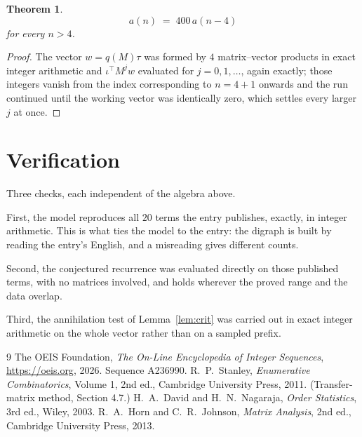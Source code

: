 \documentclass[11pt,a4paper]{article}
\theoremstyle{plain}
\newtheorem{theorem}{Theorem}
\theoremstyle{definition}
\begin{document}
\begin{theorem}
\[
a(n)\;=\;400\,a(n-4)
\]
for every $n>4$.
\end{theorem}

\begin{proof}
The vector $w=q(M)\tau$ was formed by $4$ matrix--vector products in exact integer
arithmetic and $\iota^{\!\top}M^{j}w$ evaluated for $j=0,1,\dots$, again exactly; those
integers vanish from the index corresponding to $n=4+1$ onwards and the run continued
until the working vector was identically zero, which settles every larger $j$ at once.
\end{proof}

\section{Verification}

Three checks, each independent of the algebra above.

First, the model reproduces all $20$ terms the entry publishes, exactly, in integer
arithmetic. This is what ties the model to the entry: the digraph is built by reading the
entry's English, and a misreading gives different counts.

Second, the conjectured recurrence was evaluated directly on those published terms, with no
matrices involved, and holds wherever the proved range and the data overlap.

Third, the annihilation test of Lemma~\ref{lem:crit} was carried out in exact integer
arithmetic on the whole vector rather than on a sampled prefix.

\begin{thebibliography}{9}
 The OEIS Foundation, \emph{The On-Line Encyclopedia of Integer
Sequences}, \url{https://oeis.org}, 2026. Sequence A236990.
 R.~P.~Stanley, \emph{Enumerative Combinatorics}, Volume 1, 2nd ed.,
Cambridge University Press, 2011. (Transfer-matrix method, Section 4.7.)
 H.~A.~David and H.~N.~Nagaraja, \emph{Order Statistics}, 3rd ed., Wiley,
2003.
 R.~A.~Horn and C.~R.~Johnson, \emph{Matrix Analysis}, 2nd ed., Cambridge
University Press, 2013.
\end{thebibliography}
\end{document}
